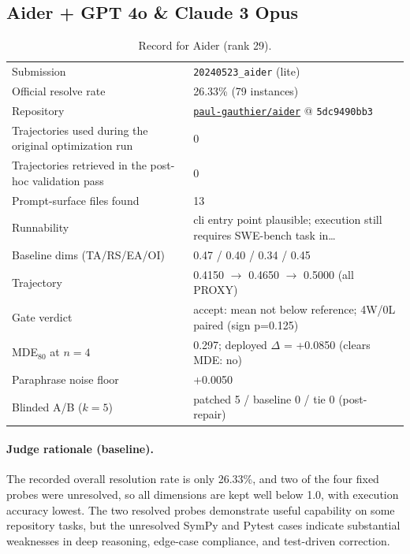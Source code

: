 \subsection{Aider + GPT 4o \& Claude 3 Opus}
\label{app:agent29}
\begin{table}[h]\centering\scriptsize
\caption{Record for Aider (rank 29).}
\begin{tabular}{lp{8.2cm}}\toprule
Submission & \texttt{20240523\_\allowbreak{}aider} (lite) \\
Official resolve rate & 26.33\% (79 instances) \\
Repository & \href{https://github.com/paul-gauthier/aider}{\texttt{paul-gauthier/aider}} @ \texttt{5dc9490bb3} \\
Trajectories used during the original optimization run & 0 \\
Trajectories retrieved in the post-hoc validation pass & 0 \\
Prompt-surface files found & 13 \\
Runnability & cli entry point plausible; execution still requires SWE-bench task in\ldots{} \\
Baseline dims (TA/RS/EA/OI) & 0.47 / 0.40 / 0.34 / 0.45 \\
Trajectory & 0.4150 $\to$ 0.4650 $\to$ 0.5000 (all PROXY) \\
Gate verdict & accept: mean not below reference; 4W/0L paired (sign p=0.125) \\
MDE$_{80}$ at $n{=}4$ & 0.297; deployed $\Delta$ = +0.0850 (clears MDE: no) \\
Paraphrase noise floor & +0.0050 \\
Blinded A/B ($k{=}5$) & patched 5 / baseline 0 / tie 0 (post-repair) \\
\bottomrule\end{tabular}\end{table}
\paragraph{Judge rationale (baseline).}
The recorded overall resolution rate is only 26.33\%, and two of the four fixed probes were unresolved, so all dimensions are kept well below 1.0, with execution accuracy lowest. The two resolved probes demonstrate useful capability on some repository tasks, but the unresolved SymPy and Pytest cases indicate substantial weaknesses in deep reasoning, edge-case compliance, and test-driven correction.
